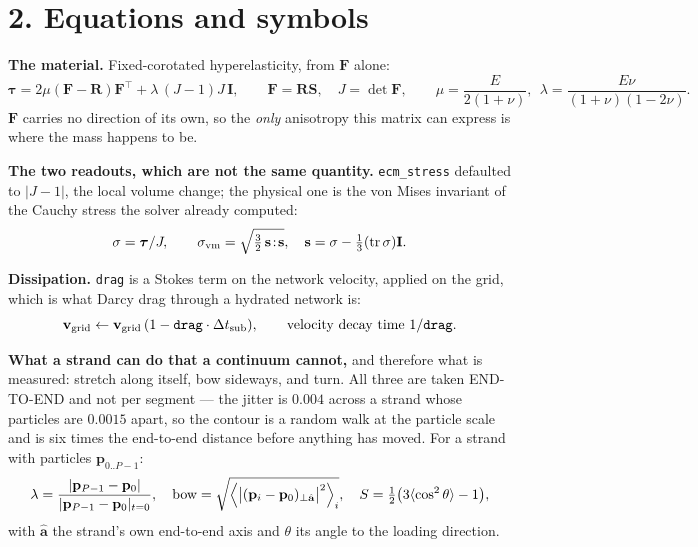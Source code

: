 \documentclass[10pt,a4paper]{article}
\newcommand{\code}[1]{\texttt{#1}}
\newcommand{\op}[1]{\texttt{#1}}
\begin{document}
\section*{2.\; Equations and symbols}

\textbf{The material.} Fixed-corotated hyperelasticity, from $\mathbf F$ alone:
%
\begin{equation}
\boldsymbol\tau = 2\mu(\mathbf F-\mathbf R)\mathbf F^{\!\top}+\lambda\,(J-1)J\,\mathbf I,
\qquad \mathbf F=\mathbf R\mathbf S,\quad J=\det\mathbf F,
\qquad \mu=\frac{E}{2(1+\nu)},\ \ \lambda=\frac{E\nu}{(1+\nu)(1-2\nu)} .
\label{eq:fcr}
\end{equation}
%
$\mathbf F$ carries no direction of its own, so the \emph{only} anisotropy this matrix can express is
where the mass happens to be.

\textbf{The two readouts, which are not the same quantity.} \op{ecm\_stress} defaulted to $|J-1|$, the
local volume change; the physical one is the von Mises invariant of the Cauchy stress the solver
already computed:
%
\begin{equation}
\sigma=\boldsymbol\tau/J,\qquad
\sigma_{\rm vm}=\sqrt{\tfrac32\,\mathbf s\!:\!\mathbf s},\quad
\mathbf s=\sigma-\tfrac13(\operatorname{tr}\sigma)\mathbf I .
\label{eq:vm}
\end{equation}

\textbf{Dissipation.} \code{drag} is a Stokes term on the network velocity, applied on the grid, which
is what Darcy drag through a hydrated network is:
%
\begin{equation}
\mathbf v_{\rm grid}\leftarrow\mathbf v_{\rm grid}\,(1-\code{drag}\cdot\Delta t_{\rm sub}),
\qquad \text{velocity decay time } 1/\code{drag}.
\label{eq:drag}
\end{equation}

\textbf{What a strand can do that a continuum cannot,} and therefore what is measured: stretch along
itself, bow sideways, and turn. All three are taken END-TO-END and not per segment --- the jitter is
$0.004$ across a strand whose particles are $0.0015$ apart, so the contour is a random walk at the
particle scale and is six times the end-to-end distance before anything has moved. For a strand with
particles $\mathbf p_{0..P-1}$:
%
\begin{equation}
\lambda=\frac{|\mathbf p_{P-1}-\mathbf p_0|}{|\mathbf p_{P-1}-\mathbf p_0|_{t=0}},
\quad
\text{bow}=\sqrt{\Bigl\langle\bigl|(\mathbf p_i-\mathbf p_0)_{\perp\hat{\mathbf a}}\bigr|^2\Bigr\rangle_i},
\quad
S=\tfrac12\bigl(3\langle\cos^2\theta\rangle-1\bigr),
\label{eq:fibre}
\end{equation}
%
with $\hat{\mathbf a}$ the strand's own end-to-end axis and $\theta$ its angle to the loading
direction.
\end{document}
